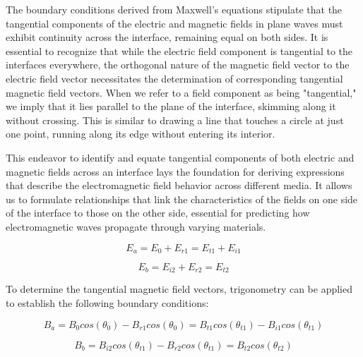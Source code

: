 The boundary conditions derived from Maxwell's equations stipulate that the tangential components of the electric and magnetic fields in plane waves must exhibit continuity across the interface, remaining equal on both sides. It is essential to recognize that while the electric field component is tangential to the interfaces everywhere, the orthogonal nature of the magnetic field vector to the electric field vector necessitates the determination of corresponding tangential magnetic field vectors. When we refer to a field component as being "tangential," we imply that it lies parallel to the plane of the interface, skimming along it without crossing. This is similar to drawing a line that touches a circle at just one point, running along its edge without entering its interior.

This endeavor to identify and equate tangential components of both electric and magnetic fields across an interface lays the foundation for deriving expressions that describe the electromagnetic field behavior across different media. It allows us to formulate relationships that link the characteristics of the fields on one side of the interface to those on the other side, essential for predicting how electromagnetic waves propagate through varying materials.

    \begin{equation} \label{E_a - Multilayer films electric field boundary equations}
    E_a = E_0 + E_{r1} = E_{t1} + E_{i1}
    \end{equation}
    
    \begin{equation} \label{E_b - Multilayer films electric field boundary equations}
    E_b = E_{i2} + E_{r2} = E_{t2}
    \end{equation}

To determine the tangential magnetic field vectors, trigonometry can be applied to establish the following boundary conditions:

    \begin{equation} \label{B_a - Multilayer films magnetic field boundary equations}
    B_a = B_0cos(\theta_0) - B_{r1}cos(\theta_0) = B_{t1}cos(\theta_{t1}) - B_{i1}cos(\theta_{t1})
    \end{equation}

    \begin{equation} \label{B_b - Multilayer films magnetic field boundary equations}
    B_b = B_{i2}cos(\theta_{t1}) - B_{r2}cos(\theta_{t1}) = B_{t2}cos(\theta_{t2})
    \end{equation}


